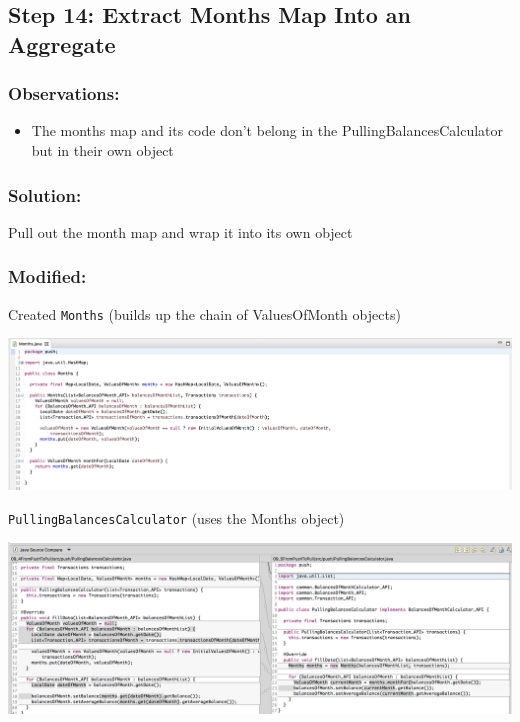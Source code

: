 \documentclass[a4paper,fleqn,titlepage,11pt]{article}
\begin{document}
\subsection*{Step 14: Extract Months Map Into an Aggregate}

\subsubsection*{Observations:}
\begin{itemize}
\item The months map and its code don't belong in the PullingBalancesCalculator but in their own object
\end{itemize}

\subsubsection*{Solution:}

Pull out the month map and wrap it into its own object

\subsubsection*{Modified:}

Created \texttt{Months} (builds up the chain of ValuesOfMonth objects)

\includegraphics[width=1\textwidth]{CompareViews/14-1.png}

\texttt{PullingBalancesCalculator} (uses the Months object)

\includegraphics[width=1\textwidth]{CompareViews/09_4-14-2.png}
\end{document}

